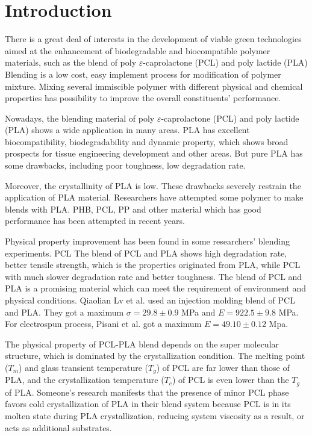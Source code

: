 \documentclass{Head}
\begin{document}
\linenumbers
\tableofcontents
\enabstract{
  \lipsum[1]
}
\section{Introduction} %
There is a great deal of interests in the development of viable green technologies aimed at the enhancement of biodegradable and biocompatible polymer materials, such as the blend of poly $\varepsilon$-caprolactone (PCL) and poly lactide (PLA) Blending is a low cost, easy implement process for modification of polymer mixture. Mixing several immiscible polymer with different physical and chemical properties has possibility to improve the overall constituents' performance.


Nowadays, the blending material of poly $\varepsilon$-caprolactone (PCL) and poly lactide (PLA) shows a wide application in many areas. PLA has excellent biocompatibility, biodegradability and dynamic property, which shows broad prospects for tissue engineering development and other areas. But pure PLA has some drawbacks, including poor toughness, low degradation rate.


Moreover, the crystallinity of PLA is low. These drawbacks severely restrain the application of PLA material. Researchers have attempted some polymer to make blends with PLA. PHB, PCL, PP and other material which has good performance has been attempted in recent years. %


Physical property improvement has been found in some researchers' blending experiments. PCL The blend of PCL and PLA shows high degradation rate, better tensile strength, which is the properties originated from PLA, while PCL with much slower degradation rate and better toughness. The blend of PCL and PLA is a promising material which can meet the requirement of environment and physical conditions. Qiaolian Lv et al.\cite{RN73} used an injection molding blend of PCL and PLA. They got a maximum $\sigma=29.8\pm0.9$ MPa and $E=922.5\pm9.8$ MPa. For electrospun process, Pisani et al.\cite{RN58} got a maximum $E=49.10\pm0.12$ Mpa.


The physical property of PCL-PLA blend depends on the super molecular structure, which is dominated by the crystallization condition. The melting point ($T_m$) and glass transient temperature ($T_g$) of PCL are far lower than those of PLA, and the crystallization temperature ($T_c$) of PCL is even lower than the $T_g$ of PLA. Someone's research manifests that the presence of minor PCL phase favors cold crystallization of PLA in their blend system because PCL is in its molten state during PLA crystallization, reducing system viscosity as a result, or acts as additional substrates.
\end{document}
